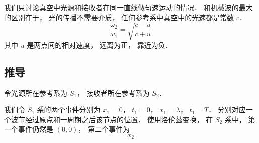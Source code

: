 

我们只讨论真空中光源和接收者在同一直线做匀速运动的情况． 和机械波的最大的区别在于， 光的传播不需要介质， 任何参考系中真空中的光速都是常数 $c$． %
\begin{equation}
\frac{\omega_2}{\omega_1} = \sqrt{\frac{c - u}{c + u}}
\end{equation}
其中 $u$ 是两点间的相对速度， 远离为正， 靠近为负．

\subsection{推导}
令光源所在参考系为 $S_1$， 接收者所在参考系为 $S_2$．

我们令 $S_1$ 系的两个事件分别为 $x_1 = 0$， $t_1 = 0$， $x_1 = \lambda$， $t_1 = T$． 分别对应一个波节经过原点和一周期之后该节点的位置． 使用洛伦兹变换， 在 $S_2$ 系中， 第一个事件仍然是 $(0, 0)$， 第二个事件为
\begin{equation}
x_2
\end{equation}

